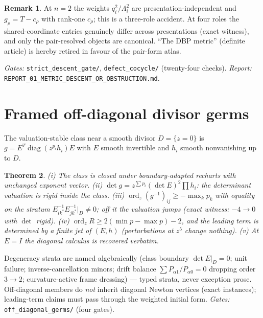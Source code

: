 \documentclass[11pt]{article}
\newtheorem{theorem}{Theorem}
\theoremstyle{definition}
\newtheorem{remark}[theorem]{Remark}
\begin{document}
\begin{remark}
At $n=2$ the weights $q_i^2/\Lambda_i^2$ are presentation-independent and
$g_\rho=T-c_\rho$ with rank-one $c_\rho$; this is a three-role accident. At four
roles the shared-coordinate entries genuinely differ across presentations (exact
witness), and only the pair-resolved objects are canonical. ``The DBP metric''
(definite article) is hereby retired in favour of the pair-form atlas.
\end{remark}

\emph{Gates:} \texttt{strict\_descent\_gate/}, \texttt{defect\_cocycle/}
(twenty-four checks). \emph{Report:} \texttt{REPORT\_01\_METRIC\_DESCENT\_OR\_OBSTRUCTION.md}.

\section{Framed off-diagonal divisor germs}
The valuation-stable class near a smooth divisor $D=\{z=0\}$ is
$g=E^T\operatorname{diag}(z^{p_i}h_i)E$ with $E$ smooth invertible and $h_i$ smooth
nonvanishing up to $D$.

\begin{theorem}\label{thm:class}
(i) The class is closed under boundary-adapted recharts with unchanged exponent
vector. (ii) $\det g=z^{\sum p_i}(\det E)^2\prod h_i$: the determinant valuation is
rigid inside the class. (iii) $\operatorname{ord}_z(g^{-1})_{ij}\ge-\max_kp_k$ with
equality on the stratum $E^{-1}_{ik^*}E^{-1}_{jk^*}|_D\neq0$; off it the valuation
jumps (exact witness: $-4\to0$ with $\det$ rigid). (iv)
$\operatorname{ord}_zR\ge2(\min p-\max p)-2$, and the leading term is determined by
a finite jet of $(E,h)$ (perturbations at $z^5$ change nothing). (v) At $E=I$ the
diagonal calculus is recovered verbatim.
\end{theorem}

Degeneracy strata are named algebraically (class boundary $\det E|_D=0$; unit
failure; inverse-cancellation minors; drift balance $\sum P_{\alpha1}/P_{\alpha0}=0$
dropping order $3\to2$; curvature-active frame dressing) --- typed strata, never
exception prose. Off-diagonal members do \emph{not} inherit diagonal Newton
vertices (exact instances); leading-term claims must pass through the weighted
initial form. \emph{Gates:} \texttt{off\_diagonal\_germs/} (four gates).
\end{document}
